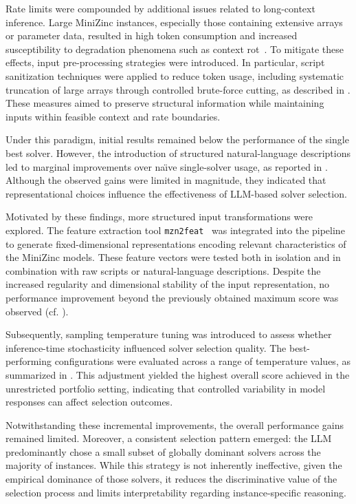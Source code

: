 \documentclass[../../main]{subfiles}
\begin{document}
Rate limits were compounded by additional issues related to long-context inference. Large MiniZinc instances, especially those containing extensive arrays or parameter data, resulted in high token consumption and increased susceptibility to degradation phenomena such as context rot~\cite{ContextRot}. To mitigate these effects, input pre-processing strategies were introduced. In particular, script sanitization techniques were applied to reduce token usage, including systematic truncation of large arrays through controlled brute-force cutting, as described in . These measures aimed to preserve structural information while maintaining inputs within feasible context and rate boundaries.

Under this paradigm, initial results remained below the performance of the single best solver. However, the introduction of structured natural-language descriptions led to marginal improvements over na\"{\i}ve single-solver usage, as reported in . Although the observed gains were limited in magnitude, they indicated that representational choices influence the effectiveness of LLM-based solver selection.

Motivated by these findings, more structured input transformations were explored. The feature extraction tool \texttt{mzn2feat}~\cite{mzn2feat} was integrated into the pipeline to generate fixed-dimensional representations encoding relevant characteristics of the MiniZinc models. These feature vectors were tested both in isolation and in combination with raw scripts or natural-language descriptions. Despite the increased regularity and dimensional stability of the input representation, no performance improvement beyond the previously obtained maximum score was observed (cf. ).

Subsequently, sampling temperature tuning was introduced to assess whether inference-time stochasticity influenced solver selection quality. The best-performing configurations were evaluated across a range of temperature values, as summarized in . This adjustment yielded the highest overall score achieved in the unrestricted portfolio setting, indicating that controlled variability in model responses can affect selection outcomes.

Notwithstanding these incremental improvements, the overall performance gains remained limited. Moreover, a consistent selection pattern emerged: the LLM predominantly chose a small subset of globally dominant solvers across the majority of instances. While this strategy is not inherently ineffective, given the empirical dominance of those solvers, it reduces the discriminative value of the selection process and limits interpretability regarding instance-specific reasoning.
\end{document}
